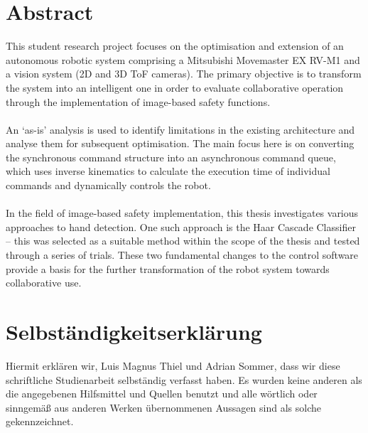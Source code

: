 \documentclass[12pt,a4paper]{report}
\newcommand{\autor}{Luis Magnus Thiel}
\newcommand{\autorzwei}{Adrian Sommer}
\begin{document}
\section*{Abstract}
This student research project focuses on the optimisation and extension of an autonomous robotic system comprising a Mitsubishi Movemaster EX RV-M1 and a vision system (2D and 3D ToF cameras). The primary objective is to transform the system into an intelligent one in order to evaluate collaborative operation through the implementation of image-based safety functions.\\
\\An ‘as-is’ analysis is used to identify limitations in the existing architecture and analyse them for subsequent optimisation. The main focus here is on converting the synchronous command structure into an asynchronous command queue, which uses inverse kinematics to calculate the execution time of individual commands and dynamically controls the robot.\\
\\In the field of image-based safety implementation, this thesis investigates various approaches to hand detection. One such approach is the Haar Cascade Classifier – this was selected as a suitable method within the scope of the thesis and tested through a series of trials. These two fundamental changes to the control software provide a basis for the further transformation of the robot system towards collaborative use.
\newpage

\thispagestyle{empty}
\section*{Selbständigkeitserklärung}


Hiermit erklären wir, \autor{} und \autorzwei, dass wir diese schriftliche Studienarbeit selbständig verfasst haben. Es wurden keine anderen als die angegebenen Hilfsmittel und Quellen benutzt und alle wörtlich oder sinngemäß aus anderen Werken übernommenen Aussagen sind als solche gekennzeichnet.
\end{document}

